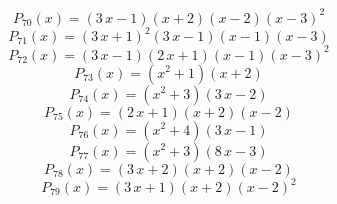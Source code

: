 \subitem \begin{dmath*}P_{70}(x) = {\left(3 \, x - 1\right)} {\left(x + 2\right)} {\left(x - 2\right)} {\left(x - 3\right)}^{2} \end{dmath*}\vspace{- 1.20000000000000 cm}
\subitem \begin{dmath*}P_{71}(x) = {\left(3 \, x + 1\right)}^{2} {\left(3 \, x - 1\right)} {\left(x - 1\right)} {\left(x - 3\right)} \end{dmath*}\vspace{- 1.20000000000000 cm}
\subitem \begin{dmath*}P_{72}(x) = {\left(3 \, x - 1\right)} {\left(2 \, x + 1\right)} {\left(x - 1\right)} {\left(x - 3\right)}^{2} \end{dmath*}\vspace{- 1.20000000000000 cm}
\subitem \begin{dmath*}P_{73}(x) = {\left(x^{2} + 1\right)} {\left(x + 2\right)} \end{dmath*}\vspace{- 1.20000000000000 cm}
\subitem \begin{dmath*}P_{74}(x) = {\left(x^{2} + 3\right)} {\left(3 \, x - 2\right)} \end{dmath*}\vspace{- 1.20000000000000 cm}
\subitem \begin{dmath*}P_{75}(x) = {\left(2 \, x + 1\right)} {\left(x + 2\right)} {\left(x - 2\right)} \end{dmath*}\vspace{- 1.20000000000000 cm}
\subitem \begin{dmath*}P_{76}(x) = {\left(x^{2} + 4\right)} {\left(3 \, x - 1\right)} \end{dmath*}\vspace{- 1.20000000000000 cm}
\subitem \begin{dmath*}P_{77}(x) = {\left(x^{2} + 3\right)} {\left(8 \, x - 3\right)} \end{dmath*}\vspace{- 1.20000000000000 cm}
\subitem \begin{dmath*}P_{78}(x) = {\left(3 \, x + 2\right)} {\left(x + 2\right)} {\left(x - 2\right)} \end{dmath*}\vspace{- 1.20000000000000 cm}
\subitem \begin{dmath*}P_{79}(x) = {\left(3 \, x + 1\right)} {\left(x + 2\right)} {\left(x - 2\right)}^{2} \end{dmath*}\vspace{- 1.20000000000000 cm}
